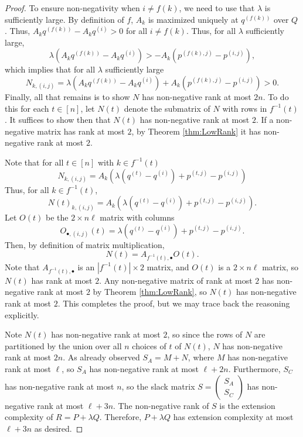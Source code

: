 \documentclass[centering,11pt,reqno]{amsart}
\theoremstyle{definition}
\begin{document}
\begin{proof}
To ensure non-negativity when $i \neq f(k)$, we need to use that $\lambda$ is sufficiently large. By definition of $f$, $A_{k}$ is maximized uniquely at $q^{(f(k))}$ over $Q$. Thus, $A_{k}q^{(f(k))} - A_{k}q^{(i)} > 0$ for all $i \neq f(k)$. Thus, for all $\lambda$ sufficiently large,
 \[\lambda (A_{k}q^{(f(k))} - A_{k}q^{(i)}) > -A_{k}(p^{(f(k),j)} - p^{(i,j)}), \]
 which implies that for all $\lambda$ sufficiently large
 \[N_{k,(i,j)} = \lambda (A_{k}q^{(f(k))} - A_{k}q^{(i)})+A_{k}(p^{(f(k),j)} - p^{(i,j)}) > 0.\]
 Finally, all that remains is to show $N$ has non-negative rank at most $2n$. To do this for each $t \in [n]$, let $N(t)$ denote the submatrix of $N$ with rows in $f^{-1}(t)$. It suffices to show then that $N(t)$ has non-negative rank at most $2$. If a non-negative matrix has rank at most $2$, by Theorem \ref{thm:LowRank} it has non-negative rank at most $2$.
 
 Note that for all $t \in [n]$ with $k \in f^{-1}(t)$
 \[N_{k,(i,j)} = A_{k}(\lambda(q^{(t)}-q^{(i)})+p^{(t,j)}-p^{(i,j)})\]
 Thus, for all $k \in f^{-1}(t)$,
 \[N(t)_{k,(i,j)} = A_{k}(\lambda(q^{(t)}-q^{(i)})+p^{(t,j)}-p^{(i,j)}). \]
 Let $O(t)$ be the $2 \times n\ell$ matrix with columns  
 \[O_{\bullet, (i,j)}(t) = \lambda(q^{(t)}-q^{(i)})+p^{(t,j)}-p^{(i,j)}.\]
 Then, by definition of matrix multiplication,
 \[N(t) = A_{f^{-1}(t),\bullet} O(t).\]
 Note that $A_{f^{-1}(t),\bullet}$ is an $|f^{-1}(t)| \times 2$ matrix, and $O(t)$ is a $2 \times n\ell$ matrix, so $N(t)$ has rank at most $2$. Any non-negative matrix of rank at most $2$ has non-negative rank at most $2$ by Theorem \ref{thm:LowRank}, so $N(t)$ has non-negative rank at most $2$. This completes the proof, but we may trace back the reasoning explicitly.
 
 
 Note $N(t)$ has non-negative rank at most $2$, so since the rows of $N$ are partitioned by the union over all $n$ choices of $t$ of $N(t)$, $N$ has non-negative rank at most $2n$. As already observed $S_{A} = M + N$, where $M$ has non-negative rank at most $\ell$, so $S_{A}$ has non-negative rank at most $\ell + 2n$. Furthermore, $S_{C}$ has non-negative rank at most $n$, so the slack matrix $S = \begin{pmatrix} S_{A} \\ S_{C}\end{pmatrix}$ has non-negative rank at most $\ell + 3n$. The non-negative rank of $S$ is the extension complexity of $R = P + \lambda Q$. Therefore, $P + \lambda Q$ has extension complexity at most $\ell + 3n$ as desired. 
\end{proof}
\end{document}
